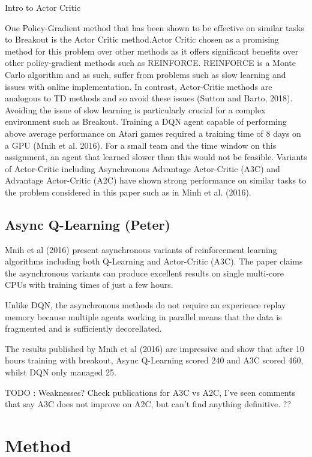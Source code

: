 \documentclass{article}
\begin{document}
Intro to Actor Critic

One Policy-Gradient method that has been shown to be effective on similar tasks to Breakout is the Actor Critic method.Actor Critic chosen as a promising method for this problem over other methods as it offers significant benefits over other policy-gradient methods such as REINFORCE. REINFORCE is a Monte Carlo  algorithm and as such, suffer from problems such as slow learning and issues with online implementation. In contrast, Actor-Critic methods are analogous to TD methods and so avoid these issues (Sutton and Barto, 2018). Avoiding the issue of slow learning is particularly crucial for a complex environment such as Breakout. Training a DQN agent capable of performing above average performance on Atari games required a training time of 8 days on a GPU (Mnih et al. 2016). For a small team and the time window on this assignment, an agent that learned slower than this would not be feasible. Variants of Actor-Critic including Asynchronous Advantage Actor-Critic (A3C) and Advantage Actor-Critic (A2C) have shown strong performance on similar tasks to the problem considered in this paper such as in Minh et al. (2016).

\subsection{Async Q-Learning (Peter)}

Mnih et al (2016) present asynchronous variants of reinforcement learning algorithms including both Q-Learning and Actor-Critic (A3C).
The paper claims the asynchronous variants can produce excellent results on single multi-core CPUs with training times of just a few hours.

Unlike DQN, the asynchronous methods do not require an experience replay memory because multiple agents working in parallel means that the data is fragmented and is sufficiently decorellated.

The results published by Mnih et al (2016) are impressive and show that after 10 hours training with breakout, Async Q-Learning scored 240 and A3C scored 460, whilst DQN only managed 25.

TODO : Weaknesses? Check publications for A3C vs A2C, I've seen comments that say A3C does not improve on A2C, but can't find anything definitive. ??


\section{Method}
\end{document}
